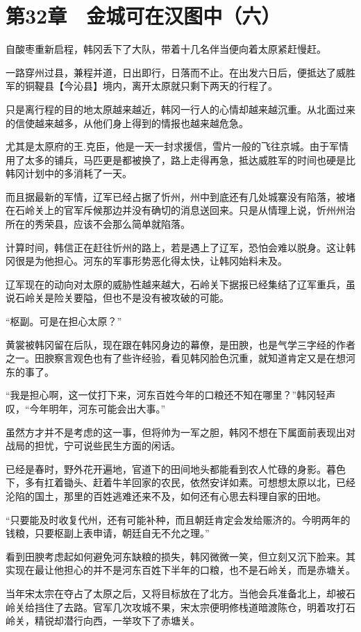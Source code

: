 \section{第32章　金城可在汉图中（六）}

自酸枣重新启程，韩冈丢下了大队，带着十几名伴当便向着太原紧赶慢赶。

一路穿州过县，兼程并道，日出即行，日落而不止。在出发六日后，便抵达了威胜军的铜鞮县【今沁县】境内，离开太原就只剩下两天的行程了。

只是离行程的目的地太原越来越近，韩冈一行人的心情却越来越沉重。从北面过来的信使越来越多，从他们身上得到的情报也越来越危急。

尤其是太原府的王.克臣，他是一天一封求援信，雪片一般的飞往京城。由于军情用了太多的铺兵，马匹更是都被换了，路上走得再急，抵达威胜军的时间也硬是比韩冈计划中的多消耗了一天。

而且据最新的军情，辽军已经占据了忻州，州中到底还有几处城寨没有陷落，被堵在石岭关上的官军斥候那边并没有确切的消息送回来。只是从情理上说，忻州州治所在的秀荣县，应该不会那么简单就陷落。

计算时间，韩信正在赶往忻州的路上，若是遇上了辽军，恐怕会难以脱身。这让韩冈很是为他担心。河东的军事形势恶化得太快，让韩冈始料未及。

辽军现在的动向对太原的威胁性越来越大，石岭关下据报已经集结了辽军重兵，虽说石岭关是险关要隘，但也不是没有被攻破的可能。

“枢副。可是在担心太原？”

黄裳被韩冈留在后队，现在跟在韩冈身边的幕僚，是田腴，也是气学三字经的作者之一。田腴察言观色也有了些许经验，看见韩冈脸色沉重，就知道肯定又是在想河东的事了。

“我是担心啊，这一仗打下来，河东百姓今年的口粮还不知在哪里？”韩冈轻声叹，“今年明年，河东可能会出大事。”

虽然方才并不是考虑的这一事，但将帅为一军之胆，韩冈不想在下属面前表现出对战局的担忧，宁可说些民生方面的闲话。

已经是春时，野外花开遍地，官道下的田间地头都能看到农人忙碌的身影。暮色下，多有扛着锄头、赶着牛羊回家的农民，依然安详如素。可想想太原以北，已经沦陷的国土，那里的百姓逃难还来不及，如何还有心思去料理自家的田地。

“只要能及时收复代州，还有可能补种，而且朝廷肯定会发给赈济的。今明两年的钱粮，只要枢副上表申请，朝廷自无不允之理。”

看到田腴考虑起如何避免河东缺粮的损失，韩冈微微一笑，但立刻又沉下脸来。其实现在最让他担心的并不是河东百姓下半年的口粮，也不是石岭关，而是赤塘关。

当年宋太宗在夺占了太原之后，又将目标放在了北方。当他会兵准备北上，却被石岭关给挡住了去路。官军几次攻城不果，宋太宗便明修栈道暗渡陈仓，明着攻打石岭关，精锐却潜行向西，一举攻下了赤塘关。


